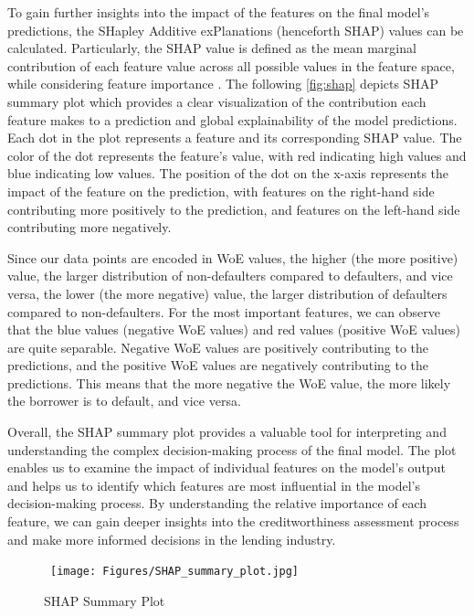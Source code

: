 To gain further insights into the impact of the features on the final model's predictions, the SHapley Additive exPlanations (henceforth SHAP) values can be calculated. Particularly, the SHAP value is defined as the mean marginal contribution of each feature value across all possible values in the feature space, while considering feature importance \citep{bhattacharya2022applied}.
The following \autoref{fig:shap} depicts SHAP summary plot which provides a clear visualization of the contribution each feature makes to a prediction and global explainability of the model predictions.
Each dot in the plot represents a feature and its corresponding SHAP value.
The color of the dot represents the feature's value, with red indicating high values and blue indicating low values.
The position of the dot on the x-axis represents the impact of the feature on the prediction, with features on the right-hand side contributing more positively to the prediction, and features on the left-hand side contributing more negatively.

Since our data points are encoded in WoE values, the higher (the more positive) value, the larger distribution of non-defaulters compared to defaulters, and vice versa, the lower (the more negative) value, the larger distribution of defaulters compared to non-defaulters.
For the most important features, we can observe that the blue values (negative WoE values) and red values (positive WoE values) are quite separable.
Negative WoE values are positively contributing to the predictions, and the positive WoE values are negatively contributing to the predictions. This means that the more negative the WoE value, the more likely the borrower is to default, and vice versa.

Overall, the SHAP summary plot provides a valuable tool for interpreting and understanding the complex decision-making process of the final model.
The plot enables us to examine the impact of individual features on the model's output and helps us to identify which features are most influential in the model's decision-making process.
By understanding the relative importance of each feature, we can gain deeper insights into the creditworthiness assessment process and make more informed decisions in the lending industry.

\begin{figure}[H]
\centering
\caption{SHAP Summary Plot}\vspace{0.5em}
\label{fig:shap}\
\texttt{[image: Figures/SHAP\_summary\_plot.jpg]}
\vspace{-1em}
\end{figure}


